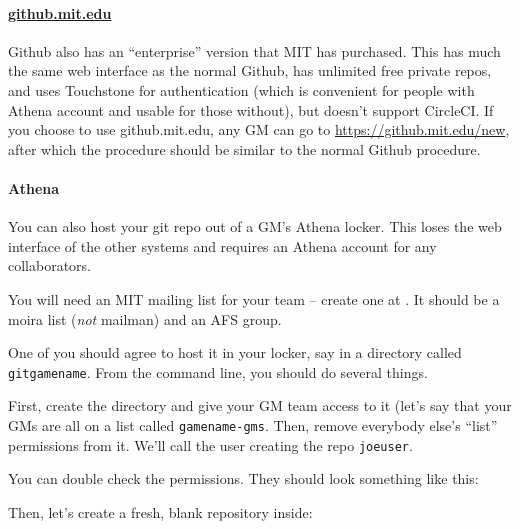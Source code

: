 \documentclass[green]{testgame}
\begin{document}
\paragraph*{\href{https://github.mit.edu}{github.mit.edu}} Github also has an ``enterprise'' version that MIT has purchased. This has much the same web interface as the normal Github, has unlimited free private repos, and uses Touchstone for authentication (which is convenient for people with Athena account and usable for those without), but doesn't support CircleCI. If you choose to use github.mit.edu, any GM can go to \url{https://github.mit.edu/new}, after which the procedure should be similar to the normal Github procedure.

\paragraph*{Athena} You can also host your git repo out of a GM's Athena locker. This loses the web interface of the other systems and requires an Athena account for any collaborators.

You will need an MIT mailing list for your team -- create one at .  It should be a moira list (\emph{not} mailman) and an AFS group.

One of you should agree to host it in your locker, say in a directory called \texttt{gitgamename}. From the command line, you should do several things.

First, create the directory and give your GM team access to it (let's
say that your GMs are all on a list called \texttt{gamename-gms}. Then,
remove everybody else's ``list'' permissions from it. We'll call the
user creating the repo \texttt{joeuser}.


You can double check the permissions. They should look something like
this:


Then, let's create a fresh, blank repository inside:
\end{document}
